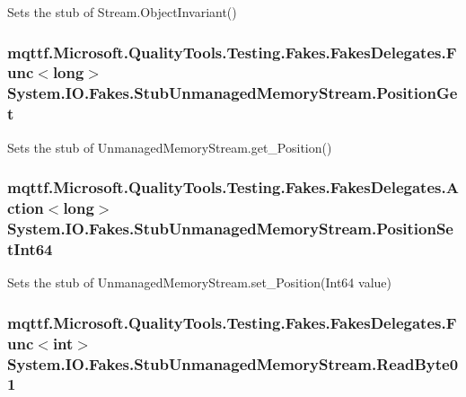Sets the stub of Stream.\-Object\-Invariant()

\hypertarget{class_system_1_1_i_o_1_1_fakes_1_1_stub_unmanaged_memory_stream_a8be370433512ca0689f786fb412048da}{
\subsubsection[{Position\-Get}]{\setlength{\rightskip}{0pt plus 5cm}mqttf.\-Microsoft.\-Quality\-Tools.\-Testing.\-Fakes.\-Fakes\-Delegates.\-Func$<$long$>$ System.\-I\-O.\-Fakes.\-Stub\-Unmanaged\-Memory\-Stream.\-Position\-Get}}\label{class_system_1_1_i_o_1_1_fakes_1_1_stub_unmanaged_memory_stream_a8be370433512ca0689f786fb412048da}


Sets the stub of Unmanaged\-Memory\-Stream.\-get\-\_\-\-Position()

\hypertarget{class_system_1_1_i_o_1_1_fakes_1_1_stub_unmanaged_memory_stream_a3ece392b4334b09addc5f8d25bc3fcf2}{
\subsubsection[{Position\-Set\-Int64}]{\setlength{\rightskip}{0pt plus 5cm}mqttf.\-Microsoft.\-Quality\-Tools.\-Testing.\-Fakes.\-Fakes\-Delegates.\-Action$<$long$>$ System.\-I\-O.\-Fakes.\-Stub\-Unmanaged\-Memory\-Stream.\-Position\-Set\-Int64}}\label{class_system_1_1_i_o_1_1_fakes_1_1_stub_unmanaged_memory_stream_a3ece392b4334b09addc5f8d25bc3fcf2}


Sets the stub of Unmanaged\-Memory\-Stream.\-set\-\_\-\-Position(\-Int64 value)

\hypertarget{class_system_1_1_i_o_1_1_fakes_1_1_stub_unmanaged_memory_stream_aadd3ba1a63022f0c7944d725684d7c6c}{
\subsubsection[{Read\-Byte01}]{\setlength{\rightskip}{0pt plus 5cm}mqttf.\-Microsoft.\-Quality\-Tools.\-Testing.\-Fakes.\-Fakes\-Delegates.\-Func$<$int$>$ System.\-I\-O.\-Fakes.\-Stub\-Unmanaged\-Memory\-Stream.\-Read\-Byte01}}\label{class_system_1_1_i_o_1_1_fakes_1_1_stub_unmanaged_memory_stream_aadd3ba1a63022f0c7944d725684d7c6c}


